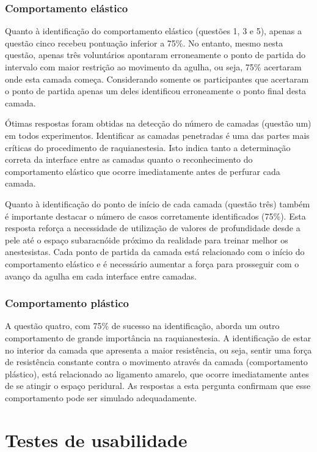 \subsubsection{Comportamento elástico}

Quanto à identificação do comportamento elástico (questões 1, 3 e 5), apenas a questão cinco recebeu pontuação inferior a 75\%. No entanto, mesmo nesta questão, apenas três voluntários apontaram erroneamente o ponto de partida do intervalo com maior restrição ao movimento da agulha, ou seja, 75\% acertaram onde esta camada começa. Considerando somente os participantes que acertaram o ponto de partida apenas um deles identificou erroneamente o ponto final desta camada. 

Ótimas respostas foram obtidas na detecção do número de camadas (questão um) em todos experimentos. Identificar as camadas penetradas é uma das partes mais críticas do procedimento de raquianestesia. Isto indica tanto a determinação correta  da interface entre as camadas quanto o reconhecimento do comportamento elástico que ocorre imediatamente antes de perfurar cada camada.

Quanto à identificação do ponto de início de cada camada (questão três) também é importante destacar o número de casos corretamente identificados (75\%). Esta resposta reforça a necessidade de utilização de valores de profundidade desde a pele até o espaço subaracnóide próximo da realidade para treinar melhor os anestesistas. Cada ponto de partida da camada está relacionado com o início do comportamento elástico e é necessário aumentar a força para prosseguir com o avanço da agulha em cada interface entre camadas. 

\subsubsection{Comportamento plástico}

A questão quatro, com 75\% de sucesso na identificação, aborda um outro comportamento de grande importância na raquianestesia. A identificação de estar no interior da camada que apresenta a maior
resistência, ou seja, sentir uma força de resistência constante contra o movimento através da camada (comportamento plástico), está relacionado ao ligamento amarelo, que ocorre imediatamente antes de se atingir o espaço peridural. As respostas a esta pergunta
confirmam que esse comportamento pode ser simulado adequadamente.

\section{Testes de usabilidade}
\label{sec:testeUsabilidade}

